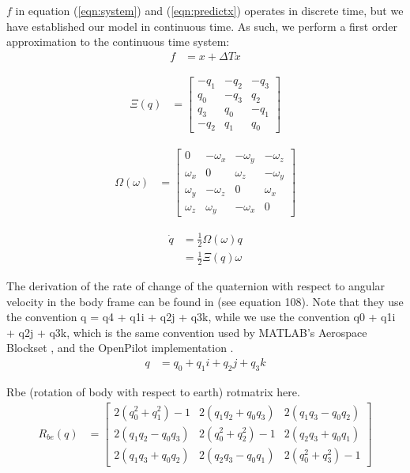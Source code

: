 \documentclass[]{article}
\begin{document}
{$f$ in equation (\ref{eqn:system}) and (\ref{eqn:predictx}) operates in discrete time, but we have established our model in continuous time. As such, we perform a first order approximation to the continuous time system:
\begin{align}
	f &= x + \Delta T \dot{x}
	\label{eqn:descrete_f}
\end{align}

\begin{align}
	\Xi(q) &=
	\left[
	\begin{matrix}
		-q_1 	& -q_2	& -q_3 	\\
		q_0		& -q_3 	& q_2 	\\
		q_3 	& q_0 	& -q_1 	\\
		-q_2 	& q_1 	& q_0
	\end{matrix}
	\right]
\end{align}

\begin{align}
	\Omega(\omega) &=
	\left[
	\begin{matrix}
		0 			& -\omega_x 	& -\omega_y	& -\omega_z	\\
		\omega_x 	& 0 			& \omega_z 	& -\omega_y \\
		\omega_y 	& -\omega_z 	& 0 		& \omega_x 	\\
		\omega_z 	& \omega_y		& -\omega_x & 0
	\end{matrix}
	\right]
\end{align}

\begin{align}
	\dot{q} 	&= \frac{1}{2} \Omega(\omega) q \\
				&= \frac{1}{2} \Xi(q) \omega
\end{align}

The derivation of the rate of change of the quaternion with respect to angular velocity in the body frame can be found in \cite{MARSlab} (see equation 108). Note that they use the convention q = q4 + q1i + q2j + q3k, while we use the convention q0 + q1i + q2j + q3k, which is the same convention used by MATLAB's Aerospace Blockset \cite{MATLABAerospace}, and the OpenPilot implementation \cite{OpenPilotPaper}.
\begin{align}
	q &= q_0 + q_1i + q_2j + q_3k
\end{align}

Rbe (rotation of body with respect to earth)
rotmatrix here.
\begin{align}
	R_{be}(q) &=
	\left[
	\begin{matrix}
		2(q_0^2 + q_1^2) - 1 	& 2(q_1 q_2 + q_0 q_3) 	& 2(q_1 q_3 - q_0 q_2) \\
		2(q_1 q_2 - q_0 q_3) 	& 2(q_0^2 + q_2^2) - 1 	& 2(q_2 q_3 + q_0 q_1) \\
		2(q_1 q_3 + q_0 q_2)	& 2(q_2 q_3 - q_0 q_1)	& 2(q_0^2 + q_3^2) - 1
	\end{matrix}
	\right]
\end{align}

}
\end{document}
